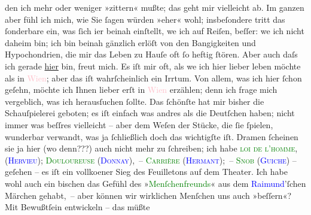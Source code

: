                     den ich mehr oder weniger »zittern« mußte; das geht mir vielleicht ab. Im ganzen
                    aber fühl ich mich, wie Sie ſagen würden »eher« wohl; insbeſondere tritt das
                    ſonderbare ein, was ſich i{\geminationm}er beinah einſtellt,
                    we{\geminationn} ich auf Reiſen, beſſer: we{\geminationn} ich nicht daheim
                    bin; ich bin beinah gänzlich erlöſt von den Bangigkeiten und Hypochondrien, die
                    mir das Leben zu Hauſe oft ſo heftig ſtören. Aber \introOben{}auch\introOben{}
                    daſs ich gerade \uline{hier} bin, freut mich. Es iſt mir
                    oft, als we{\geminationn} ich hier lieber leben möchte als in \textcolor{pink}{Wien}{}\ledrightnote{\textcolor{pink}{Wien}}; aber das iſt wahrſchein{\pb}lich ein
                    Irrtum. Von allem, was ich hier ſchon geſehn, möchte ich Ihnen lieber erſt in
                        \textcolor{pink}{Wien}{}\ledrightnote{\textcolor{pink}{Wien}} erzählen; denn ich frage mich
                    vergeblich, was ich herausſuchen ſollte. Das ſchönſte hat mir bisher die
                    Schauſpielerei geboten; es iſt einfach was andres als die Deutſchen haben; nicht
                    immer was beſſres vielleicht – aber dem Weſen der Stücke, die ſie ſpielen,
                    wunderbar verwandt, was ja ſchließlich doch das wichtigſte iſt. Dramen ſcheinen
                    sie ja hier (wo denn???) auch nicht mehr zu ſchreiben; ich habe \textsc{\textcolor{green}{loi de l’homme}{}\ledrightnote{\textcolor{green}{Männerrecht}}, (\textcolor{blue}{Hervieu}{}\ledrightnote{\textcolor{blue}{Paul Ernest Hervieu}}); \textcolor{green}{Douloureuse}{}\ledrightnote{\textcolor{green}{La Douloureuse}} (\textcolor{blue}{Donnay}{}\ledrightnote{\textcolor{blue}{Maurice Donnay}}), – \textcolor{green}{Carrière}{}\ledrightnote{\textcolor{green}{La Carrière}} (\textcolor{blue}{Hermant}{}\ledrightnote{\textcolor{blue}{Abel Hermant}}); – \textcolor{green}{Snob}{}\ledrightnote{\textcolor{green}{Snob}} (\textcolor{blue}{Guiche}{}\ledrightnote{\textcolor{blue}{Gustave Guiches}})} – geſehen – es iſt ein
                    vollko{\geminationm}ener Sieg des Feuilletons auf dem Theater. Ich habe {\pb}wohl auch ein bischen das Gefühl des »\textcolor{green}{Menſchenfreunds}{}« aus dem \textcolor{blue}{Raimund}{}\ledrightnote{\textcolor{blue}{Ferdinand Raimund}}’ſchen Märchen gehabt, – aber können
                    wir wirklichen Menſchen uns auch »beſſern«? Mit Bewußtſein entwickeln – das müßte
